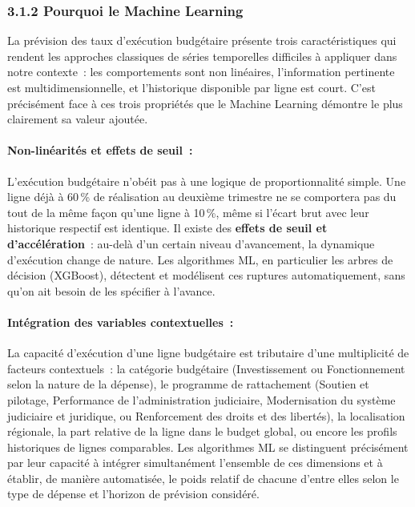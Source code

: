 \subsubsection*{3.1.2 \quad Pourquoi le Machine Learning}

La pr\'evision des taux d'ex\'ecution budg\'etaire pr\'esente trois caract\'eristiques
qui rendent les approches classiques de s\'eries temporelles difficiles \`a appliquer
dans notre contexte~: les comportements sont non lin\'eaires, l'information pertinente
est multidimensionnelle, et l'historique disponible par ligne est court. C'est
pr\'ecis\'ement face \`a ces trois propri\'et\'es que le Machine Learning d\'emontre
le plus clairement sa valeur ajout\'ee.

\paragraph{Non-lin\'earit\'es et effets de seuil~:}

L'ex\'ecution budg\'etaire n'ob\'eit pas \`a une logique de proportionnalit\'e
simple. Une ligne d\'ej\`a \`a 60\,\% de r\'ealisation au deuxi\`eme trimestre
ne se comportera pas du tout de la m\^eme fa\c{c}on qu'une ligne \`a 10\,\%,
m\^eme si l'\'ecart brut avec leur historique respectif est identique. Il existe
des \textbf{effets de seuil et d'acc\'el\'eration}~: au-del\`a d'un certain
niveau d'avancement, la dynamique d'ex\'ecution change de nature. Les algorithmes
ML, en particulier les arbres de d\'ecision (XGBoost), d\'etectent et mod\'elisent
ces ruptures automatiquement, sans qu'on ait besoin de les sp\'ecifier \`a
l'avance.

\paragraph{Int\'egration des variables contextuelles~:}

La capacit\'e d'ex\'ecution d'une ligne budg\'etaire est tributaire d'une multiplicit\'e
de facteurs contextuels~: la cat\'egorie budg\'etaire (Investissement ou Fonctionnement
selon la nature de la d\'epense), le programme de rattachement (Soutien et pilotage,
Performance de l'administration judiciaire, Modernisation du syst\`eme judiciaire et
juridique, ou Renforcement des droits et des libert\'es), la localisation r\'egionale,
la part relative de la ligne dans le budget global, ou encore les profils historiques
de lignes comparables. Les algorithmes ML se distinguent pr\'ecis\'ement par leur capacit\'e
\`a int\'egrer simultan\'ement l'ensemble de ces dimensions et \`a \'etablir, de mani\`ere
automatis\'ee, le poids relatif de chacune d'entre elles selon le type de d\'epense et
l'horizon de pr\'evision consid\'er\'e.

